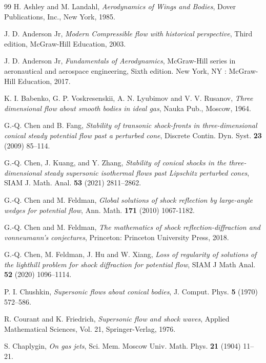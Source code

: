 \documentclass[reqno,12pt]{amsart}
\numberwithin{equation}{section}
\begin{document}
\begin{thebibliography}{99}
 H. Ashley and M. Landahl, {\it Aerodynamics of Wings and Bodies}, Dover Publications, Inc., New York, 1985.

 J. D. Anderson Jr, {\it Modern Compressible flow with historical perspective}, Third edition, McGraw-Hill Education, 2003.

 J. D. Anderson Jr, {\it Fundamentals of Aerodynamics}, McGraw-Hill series in aeronautical and aerospace engineering, Sixth edition. New York, NY : McGraw-Hill Education, 2017.

 K. I. Babenko, G. P. Voskresenskii, A. N. Lyubimov and V. V. Rusanov, {\it Three dimensional flow about smooth bodies in ideal gas}, Nauka Pub., Moscow, 1964.

 G.-Q. Chen and B. Fang, {\it Stability of transonic shock-fronts in three-dimensional conical steady potential flow past a perturbed cone}, Discrete Contin. Dyn. Syst. {\bf 23} (2009) 85--114.

 G.-Q. Chen, J. Kuang, and Y. Zhang, {\it Stability of conical shocks in the three-dimensional steady supersonic isothermal flows past Lipschitz perturbed cones}, SIAM J. Math. Anal. {\bf 53} (2021) 2811--2862.

 G.-Q. Chen and M. Feldman, {\it Global solutions of shock reflection by large-angle wedges for potential flow}, Ann. Math. {\bf 171} (2010) 1067-1182.

 G.-Q. Chen and M. Feldman, {\it The mathematics of shock reflection-diffraction and vonneumann’s conjectures}, Princeton: Princeton University Press, 2018.

 G.-Q. Chen, M. Feldman, J. Hu and W. Xiang, {\it Loss of regularity of solutions of the lighthill problem for shock diffraction for potential flow}, SIAM J Math Anal. {\bf 52} (2020) 1096–1114.

 P. I. Chushkin, {\it Supersonic flows about conical bodies}, J. Comput. Phys. {\bf 5} (1970) 572--586.

 R. Courant and K. Friedrich, {\it Supersonic flow and shock waves}, Applied Mathematical Sciences, Vol. 21, Springer-Verlag, 1976.

 S. Chaplygin, {\it On gas jets}, Sci. Mem. Moscow Univ. Math. Phys. {\bf 21} (1904) 11--21.


\end{thebibliography}
\end{document}
